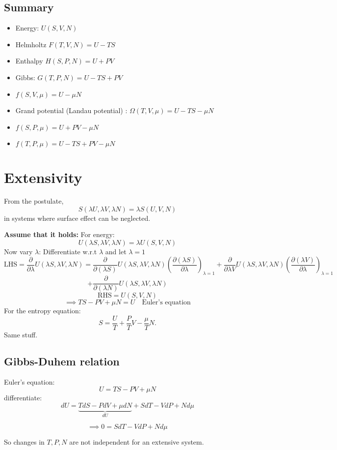 \documentclass[11pt]{book}
\theoremstyle{definition}
\begin{document}
\subsection{Summary}
\begin{itemize}
	\item Energy: $ U(S,V,N) $ 
	\item Helmholtz $ F(T,V,N) = U - TS $ 
	\item Enthalpy $ H(S,P,N) = U + PV$ 
	\item Gibbs: $ G(T,P,N) = U-TS+PV $ 
	\item $ f(S,V,\mu) = U - \mu N $
	\item Grand potential (Landau potential) : $ \Omega(T,V,\mu) = U-TS-\mu N$
	\item  $ f(S,P,\mu) = U+PV-\mu N$
	\item $ f(T,P,\mu) = U-TS+PV-\mu N $ 
\end{itemize}

\section{Extensivity}
From the postulate,
\[ S(\lambda U, \lambda V, \lambda N) = \lambda S(U,V,N)\] in systems where surface effect can be neglected. 

\textbf{Assume that it holds:} 
For energy:
\[ U(\lambda S, \lambda V, \lambda N) = \lambda U(S,V,N) \] 
Now vary $ \lambda $:
Differentiate w.r.t $ \lambda $ and let $ \lambda =1 $ 
\[ \text{LHS} = \frac{\partial }{\partial \lambda} U(\lambda S, \lambda V, \lambda N) = \frac{\partial }{\partial (\lambda S)} U(\lambda S, \lambda V, \lambda N) \left (\frac{\partial (\lambda S)}{\partial \lambda} \right )_{\lambda = 1} + 
\frac{\partial }{\partial \lambda V} U(\lambda S, \lambda V, \lambda N) \left (\frac{\partial (\lambda V)}{\partial \lambda}\right )_{\lambda =1} \]
\[ + \frac{\partial }{\partial (\lambda N)}U(\lambda S, \lambda V, \lambda N)\] 
\[ \text{RHS} = U(S,V,N) \] 
\begin{equation}
	\implies TS-PV+\mu N = U \quad \text{Euler's equation}
\end{equation}
For the entropy equation:
\[ S = \frac{U}{T} + \frac{P}{T}V - \frac{\mu}{T}N. \] 
Same stuff.

\subsection{Gibbs-Duhem relation}
Euler's equation: \[ U = TS - PV + \mu N \] 
differentiate:
\[ dU = \underbrace{TdS -PdV + \mu dN}_{dU} + SdT - VdP + Nd\mu\] 
\begin{shaded*}
	\begin{equation}
		\implies 0 = SdT - VdP + N d\mu
	\end{equation}	
\end{shaded*}
So changes in $ T, P,N $ are not independent for an extensive system.
\end{document}
